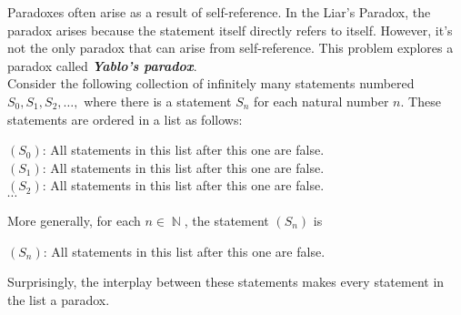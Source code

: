 \documentclass{article}
\renewcommand{\(}{\left(}
\renewcommand{\)}{\right)}
\DeclareMathOperator{\N}{\mathbb{N}}
\theoremstyle{plain}
\theoremstyle{plain}
\theoremstyle{definition}
\begin{document}
Paradoxes often arise as a result of self-reference.
In the Liar's Paradox,
the paradox arises because the statement itself directly refers to itself.
However, it's not the only paradox that can arise from self-reference.
This problem explores a paradox called \textbf{\textit{Yablo's paradox}}. \\

Consider the following collection of infinitely many statements numbered
$S_0, S_1, S_2,\dots,$ where there is a statement $S_n$ for each
natural number $n$.
These statements are ordered in a list as follows:
\begin{center}
\begin{framed}
$(S_0)$: All statements in this list after this one are false. \\
$(S_1)$: All statements in this list after this one are false. \\
$(S_2)$: All statements in this list after this one are false. \\
$\cdots$
\end{framed}
\end{center}
More generally, for each $n \in \N$,
the statement $(S_n)$ is
\begin{center}
$(S_n)$: All statements in this list after this one are false.
\end{center}
Surprisingly,
the interplay between these statements makes every statement in the list
a paradox.

\end{document}

